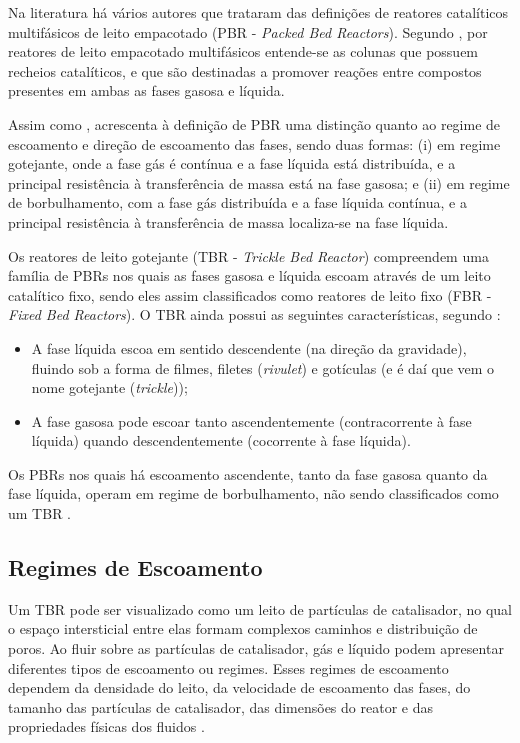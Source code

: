 Na literatura há vários autores que trataram das definições de
reatores catalíticos multifásicos de leito empacotado (PBR - \emph{Packed Bed
Reactors}).
Segundo , por reatores de leito empacotado multifásicos
entende-se as colunas que possuem recheios catalíticos, e que são destinadas a
promover reações entre compostos presentes em ambas as fases gasosa e líquida.

Assim como ,  acrescenta à
definição de PBR uma distinção quanto ao regime de escoamento e direção de
escoamento das fases, sendo duas formas: (i) em regime gotejante, onde a fase
gás é contínua e a fase líquida está distribuída, e a principal resistência à
transferência de massa está na fase gasosa; e (ii) em regime de borbulhamento,
com a fase gás distribuída e a fase líquida contínua, e a principal resistência
à transferência de massa localiza-se na fase líquida.

Os reatores de leito gotejante (TBR - \emph{Trickle Bed Reactor}) compreendem
uma família de PBRs nos quais as fases gasosa e líquida escoam através de um
leito catalítico fixo, sendo eles assim classificados como reatores de leito
fixo (FBR - \emph{Fixed Bed Reactors}). O TBR ainda possui as seguintes
características, segundo :

\begin{itemize}
\item A fase líquida escoa em sentido descendente (na direção da gravidade),
fluindo sob a forma de filmes, filetes (\emph{rivulet}) e gotículas (e é daí
que vem o nome gotejante (\emph{trickle}));
\item A fase gasosa pode escoar tanto ascendentemente (contracorrente à
fase líquida) quando descendentemente (cocorrente à fase líquida).
\end{itemize}

Os PBRs nos quais há escoamento ascendente, tanto da fase gasosa quanto da
fase líquida, operam em regime de borbulhamento, não sendo classificados como
um TBR \cite{Ancheyta2011}. 

\subsection {Regimes de Escoamento}
\label{sec:escoamento}

Um TBR pode ser visualizado como um leito de partículas de catalisador, no qual
o espaço intersticial entre elas formam complexos caminhos e distribuição de
poros. Ao fluir sobre as partículas de catalisador, gás e líquido podem
apresentar diferentes tipos de escoamento ou regimes. Esses regimes de
escoamento dependem da densidade do leito, da velocidade de escoamento das
fases, do tamanho das partículas de catalisador, das dimensões do reator e das
propriedades físicas dos fluidos \cite{Ranade2011}.

